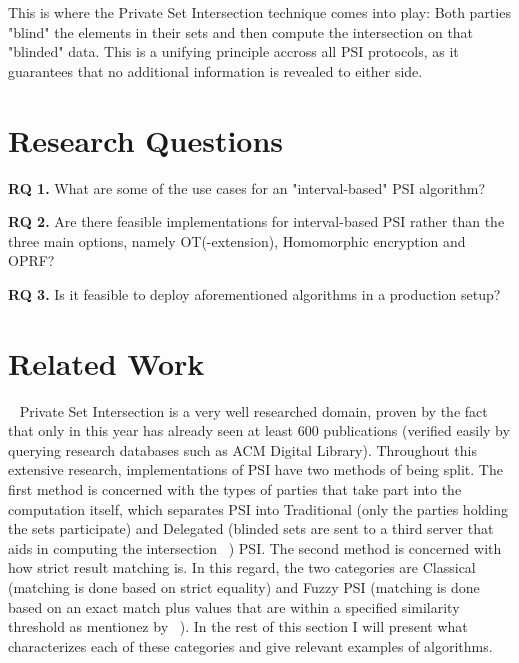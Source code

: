 \documentclass{article}
\begin{document}
\vspace{1em} 

This is where the Private Set Intersection technique comes into play: Both parties "blind" the elements in their sets and then compute the intersection on that 
"blinded" data. This is a unifying principle accross all PSI protocols, as it guarantees that no additional information is revealed to either side.

\section{Research Questions}
\textbf{RQ 1.} What are some of the use cases for an "interval-based" PSI algorithm?

\textbf{RQ 2.} Are there feasible implementations for interval-based PSI rather than the three main options, namely OT(-extension), Homomorphic encryption and OPRF?


\textbf{RQ 3.} Is it feasible to deploy aforementioned algorithms in a production setup?


\section{Related Work}
~\cite{morales_private_2023} Private Set Intersection is a very well researched domain, proven by the fact that only in this year has already seen at least 600 publications (verified easily 
by querying research databases such as ACM Digital Library). Throughout this extensive research, implementations of PSI have two methods of being split.
The first method is concerned with the types of parties that take part into the computation itself, which separates PSI
into Traditional (only the parties holding the sets participate) and Delegated (blinded sets are sent to a third server that aids in computing the intersection ~\cite{chakraborti_distance-aware_nodate}) PSI.
The second method is concerned with how strict result matching is. In this regard, the two categories are 
Classical (matching is done based on strict equality) and Fuzzy PSI (matching is done based on an exact match plus values that are within a specified similarity threshold as mentionez by ~\cite{uzun_fuzzy_nodate}).
In the rest of this section I will present what characterizes each of these categories and give relevant examples of algorithms.
\end{document}
